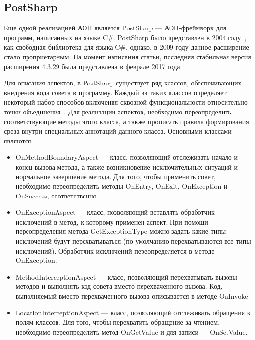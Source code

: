 \subsection{PostSharp}
\label{sub:postsharp_overwiev}
Еще одной реализацией АОП является PostSharp --- АОП-фреймворк для программ,
написанных на языке C\#.
PostSharp было представлен в 2004 году~\cite{postsharp_doc}, как свободная
библиотека для языка C\#, однако, в 2009 году данное расширение стало
проприетарным.
На момент написания статьи, последняя стабильная версия расширения 4.3.29 была
представлена в феврале 2017 года.

Для описания аспектов, в PostSharp существует ряд классов, обеспечивающих
внедрения кода совета в программу.
Каждый из таких классов определяет некоторый набор способов включения сквозной
функциональности относительно точки объединения~\cite{postsharp_aspects}.
Для реализации аспектов, необходимо переопределить соответствующие методы этого
класса, а также прописать правила формирования среза внутри специальных
аннотаций данного класса.
Основными классами~\cite{postsharp_aspects} являются:
\begin{itemize}
    \item OnMethodBoundaryAspect --- класс, позволяющий отслеживать начало и
          конец вызова метода, а также возникновение исключительных ситуаций и
          нормальное завершение метода.
          Для того, чтобы применить совет, необходимо переопределить методы
          OnEntry, OnExit, OnException и OnSuccess, соответственно.
    \item OnExceptionAspect --- класс, позволяющий вставлять обработчик
          исключений в метод, к которому применен аспект.
          При помощи переопределения метода GetExceptionType  можно задать какие
          типы исключений будут перехватываться (по умолчанию перехватываются
          все типы исключений).
          Обработчик исключений переопределяется в методе OnException.
    \item MethodInterceptionAspect --- класс, позволяющий перехватывать вызовы
          методов и выполнять код совета вместо перехваченного вызова.
          Код, выполняемый вместо перехваченного вызова описывается в методе
          OnInvoke
    \item LocationInterceptionAspect --- класс, позволяющий отслеживать
          обращения к полям классов.
          Для того, чтобы перехватить обращение за чтением, необходимо
          переопределить метод OnGetValue и для записи --- OnSetValue.
\end{itemize}

